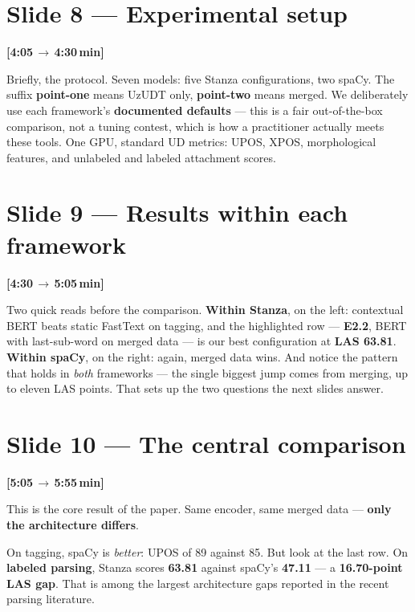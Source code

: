 \documentclass[12pt,a4paper]{article}
\newcommand{\timing}[2]{%
   \par\noindent\textbf{\small [#1\,$\to$\,#2\,min]}\par\vspace{0.2em}}
\newcommand{\say}[1]{\textbf{#1}}
\begin{document}
\section*{Slide 8 --- Experimental setup}
\timing{4:05}{4:30}

Briefly, the protocol. Seven models: five Stanza configurations, two
spaCy. The suffix \say{point-one} means UzUDT only, \say{point-two} means
merged. We deliberately use each framework's \say{documented defaults} ---
this is a fair out-of-the-box comparison, not a tuning contest, which is
how a practitioner actually meets these tools. One GPU, standard UD
metrics: UPOS, XPOS, morphological features, and unlabeled and labeled
attachment scores.

\section*{Slide 9 --- Results within each framework}
\timing{4:30}{5:05}

Two quick reads before the comparison. \say{Within Stanza}, on the left:
contextual BERT beats static FastText on tagging, and the highlighted row
--- \say{E2.2}, BERT with last-sub-word on merged data --- is our best
configuration at \textbf{LAS 63.81}. \say{Within spaCy}, on the right:
again, merged data wins. And notice the pattern that holds in \emph{both}
frameworks --- the single biggest jump comes from merging, up to eleven
LAS points. That sets up the two questions the next slides answer.

\section*{Slide 10 --- The central comparison}
\timing{5:05}{5:55}

This is the core result of the paper. Same encoder, same merged data ---
\say{only the architecture differs}.

On tagging, spaCy is \emph{better}: UPOS of 89 against 85. But look at the
last row. On \say{labeled parsing}, Stanza scores \textbf{63.81} against
spaCy's \textbf{47.11} --- a \say{16.70-point LAS gap}. That is among the
largest architecture gaps reported in the recent parsing literature.
\end{document}
